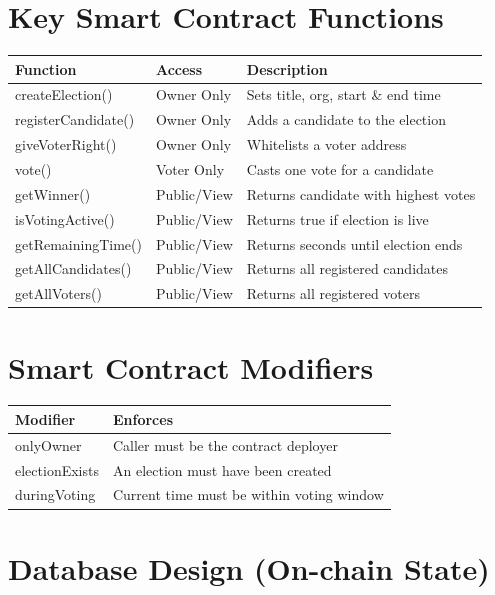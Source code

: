 \documentclass[12pt,a4paper]{report}
\begin{document}
\section{Key Smart Contract Functions}

\begin{longtable}{|l|l|l|}
\hline
\textbf{Function} & \textbf{Access} & \textbf{Description} \\
\hline
\endhead
createElection()      & Owner Only  & Sets title, org, start \& end time \\
registerCandidate()   & Owner Only  & Adds a candidate to the election \\
giveVoterRight()      & Owner Only  & Whitelists a voter address \\
vote()                & Voter Only  & Casts one vote for a candidate \\
getWinner()           & Public/View & Returns candidate with highest votes \\
isVotingActive()      & Public/View & Returns true if election is live \\
getRemainingTime()    & Public/View & Returns seconds until election ends \\
getAllCandidates()    & Public/View & Returns all registered candidates \\
getAllVoters()        & Public/View & Returns all registered voters \\
\hline
\end{longtable}

\section{Smart Contract Modifiers}

\begin{longtable}{|l|l|}
\hline
\textbf{Modifier} & \textbf{Enforces} \\
\hline
\endhead
onlyOwner   & Caller must be the contract deployer \\
electionExists & An election must have been created \\
duringVoting & Current time must be within voting window \\
\hline
\end{longtable}

\section{Database Design (On-chain State)}
\end{document}

